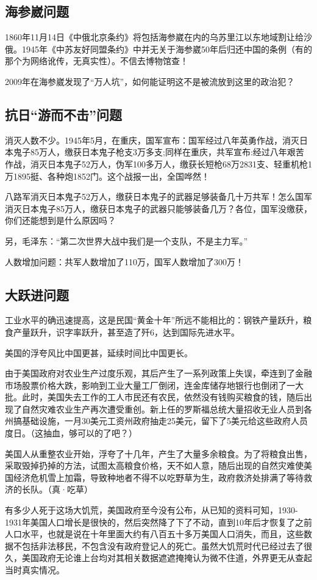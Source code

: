 \documentclass[UTF8,a4paper]{ctexart}
\begin{document}
\subsection{海参崴问题}
1860年11月14日《中俄北京条约》将包括海参崴在内的乌苏里江以东地域割让给沙俄。1945年《中苏友好同盟条约》中并无关于海参崴50年后归还中国的条例（有的那个为网络讹传，无真实性）。不信去博物馆查！

2009年在海参崴发现了“万人坑”，如何能证明这不是被流放到这里的政治犯？
\subsection{抗日“游而不击”问题}
消灭人数不少。1945年5月，在重庆，国军宣布：国军经过八年英勇作战，消灭日本鬼子85万人，缴获日本鬼子枪支3万多支;同样在重庆，共军宣布:经过八年艰苦作战，消灭日本鬼子52万人，伪军100多万人，缴获长短枪68万2831支、轻重机枪1万1895挺、各种炮1852门。这个战报一出，全国哗然！

八路军消灭日本鬼子52万人，缴获日本鬼子的武器足够装备几十万共军！怎么国军消灭日本鬼子85万人，缴获日本鬼子的武器只能够装备几万？各位，国军没缴获，你们还能想到是什么原因吗？

另，毛泽东：“第二次世界大战中我们是一个支队，不是主力军。”

人数增加问题：共军人数增加了110万，国军人数增加了300万！
\subsection{大跃进问题}
工业水平的确迅速提高，这是民国“黄金十年”所远不能相比的：钢铁产量跃升，粮食产量跃升，识字率跃升，甚至造了歼6，达到国际先进水平。

美国的浮夸风比中国更甚，延续时间比中国更长。

由于美国政府对农业生产过度乐观，其后产生了一系列政策上失误，牵连到了金融市场股票价格大跌，影响到工业大量工厂倒闭，连金库储存地银行也倒闭了一大批。此时，美国失去工作的工人市民还有农民，依然没有钱购买粮食的钱，随后出现了自然灾难农业生产再次遭受重创。新上任的罗斯福总统大量招收无业人员到各州搞基础设施，一月30美元工资州政府抽走25美元，留下了5美元给这些政府人员度日。（这抽血，够可以的了吧？）

美国人从重整农业开始，浮夸了十几年，产生了大量多余粮食。为了将粮食出售，采取毁掉扔掉的方法，试图太高粮食价格，天不如人意，随后出现的自然灾难使美国经济危机雪上加霜，导致种地者不得不以吃野草为生，政府救济处排满了等待救济的长队。（真·吃草）

有多少人死于这场大饥荒，美国政府至今没有公布，从已知的资料可知，1930-1931年美国人口增长是很快的，然后突然降了下了不动，直到10年后才恢复了之前人口水平，也就是说在十年里面大约有八百五十多万美国人口消失，而且，这些数据不包括非法移民，不包含没有政府登记人的死亡。虽然大饥荒时代已经过去了很久，美国政府无论谁上台均对其相关数据遮遮掩掩认为微不住道，外界更无从查起当时真实情况。
\end{document}
